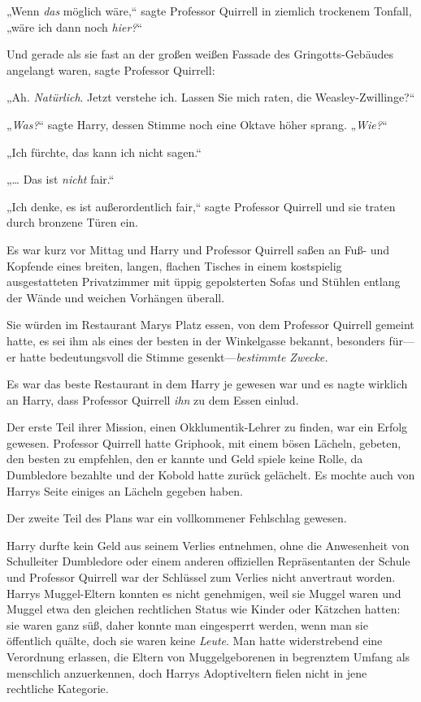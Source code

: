 {„Wenn \emph{das} möglich wäre,“ sagte Professor Quirrell in ziemlich trockenem Tonfall, „wäre ich dann noch \emph{hier?}“

Und gerade als sie fast an der großen weißen Fassade des Gringotts-Gebäudes angelangt waren, sagte Professor Quirrell:

„Ah. \emph{Natürlich}. Jetzt verstehe ich. Lassen Sie mich raten, die Weasley-Zwillinge?“

„\emph{Was?}“ sagte Harry, dessen Stimme noch eine Oktave höher sprang. „\emph{Wie?}“

„Ich fürchte, das kann ich nicht sagen.“

„… Das ist \emph{nicht} fair.“

„Ich denke, es ist außerordentlich fair,“ sagte Professor Quirrell und sie traten durch bronzene Türen ein.

\later

Es war kurz vor Mittag und Harry und Professor Quirrell saßen an Fuß- und Kopfende eines breiten, langen, flachen Tisches in einem kostspielig ausgestatteten Privatzimmer mit üppig gepolsterten Sofas und Stühlen entlang der Wände und weichen Vorhängen überall.

Sie würden im Restaurant Marys Platz essen, von dem Professor Quirrell gemeint hatte, es sei ihm als eines der besten in der Winkelgasse bekannt, besonders für—er hatte bedeutungsvoll die Stimme gesenkt—\emph{bestimmte Zwecke.}

Es war das beste Restaurant in dem Harry je gewesen war und es nagte wirklich an Harry, dass Professor Quirrell \emph{ihn} zu dem Essen einlud.

Der erste Teil ihrer Mission, einen Okklumentik-Lehrer zu finden, war ein Erfolg gewesen. Professor Quirrell hatte Griphook, mit einem bösen Lächeln, gebeten, den besten zu empfehlen, den er kannte und Geld spiele keine Rolle, da Dumbledore bezahlte und der Kobold hatte zurück gelächelt. Es mochte auch von Harrys Seite einiges an Lächeln gegeben haben.

Der zweite Teil des Plans war ein vollkommener Fehlschlag gewesen.

Harry durfte kein Geld aus seinem Verlies entnehmen, ohne die Anwesenheit von Schulleiter Dumbledore oder einem anderen offiziellen Repräsentanten der Schule und Professor Quirrell war der Schlüssel zum Verlies nicht anvertraut worden. Harrys Muggel-Eltern konnten es nicht genehmigen, weil sie Muggel waren und Muggel etwa den gleichen rechtlichen Status wie Kinder oder Kätzchen hatten: sie waren ganz süß, daher konnte man eingesperrt werden, wenn man sie öffentlich quälte, doch sie waren keine \emph{Leute}. Man hatte widerstrebend eine Verordnung erlassen, die Eltern von Muggelgeborenen in begrenztem Umfang als menschlich anzuerkennen, doch Harrys Adoptiveltern fielen nicht in jene rechtliche Kategorie.

}
